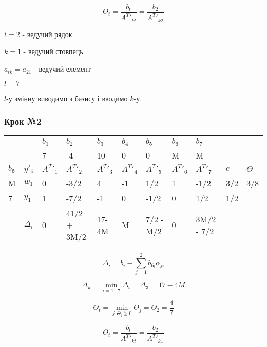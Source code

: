\documentclass[a4paper, 12pt]{article}
\begin{document}
\begin{equation*}
	\Theta_t = \frac{b_t}{A^T{'}_{kt}} = \frac{b_2}{A^T{'}_{k2}}
\end{equation*}

$t = 2$ - ведучий рядок

$k = 1$ - ведучий стовпець

$a_{tk} = a_{21}$ - ведучий елемент

$l = 7$

$l$-у змінну виводимо з базису і вводимо $k$-у.

\subsubsection{Крок №2}

\begin{table}[H]
    \centering
    \begin{tabular}{|l|l|l|l|l|l|l|l|l|l|l|}
    \hline
         &  & $b_1$ & $b_2$ & $b_3$ & $b_4$ & $b_5$ & $b_6$ & $b_7$ & & \\ \hline
         &  & 7 & -4 & 10 & 0 & 0 & M & M & &  \\ \hline
         $b_\text{б}$ & $y'_\text{б}$ & $A^T{'}_1$ & $A^T{'}_2$ & $A^T{'}_3$ & $A^T{'}_4$ & $A^T{'}_5$ & $A^T{'}_6$ & $A^T{'}_7$ & $c$  & $\Theta$ \\ \hline
        M & $w_1$ & 0 & -3/2 & 4 & -1 & 1/2 & 1 & -1/2 & 3/2 & 3/8 \\ \hline
        7 & $y_1$ & 1 & -7/2 & -1 & 0 & -1/2 & 0 & 1/2 & 1/2 & \\ \hline
         & $\Delta_i$ & 0 & 41/2 + 3M/2 & 17-4M	& M & 7/2 - M/2 & 0 & 3M/2 - 7/2 & & \\ \hline
    \end{tabular}
\end{table}

\begin{equation*}
	\Delta_i = b_i - \sum_{j=1}^{2} b_\text{бj} \alpha_{ji}  
\end{equation*}

\begin{equation*}
	\Delta_k = \min_{i=1 \dots 7} \Delta_i = \Delta_3 = 17-4M
\end{equation*}

\begin{equation*}
	\Theta_t = \min_{j: \Theta_j \geqslant 0} \Theta_j = \Theta_2 = \frac{4}{7}
\end{equation*}

\begin{equation*}
	\Theta_t = \frac{b_t}{A^T{'}_{kt}} = \frac{b_2}{A^T{'}_{k1}}
\end{equation*}
\end{document}
